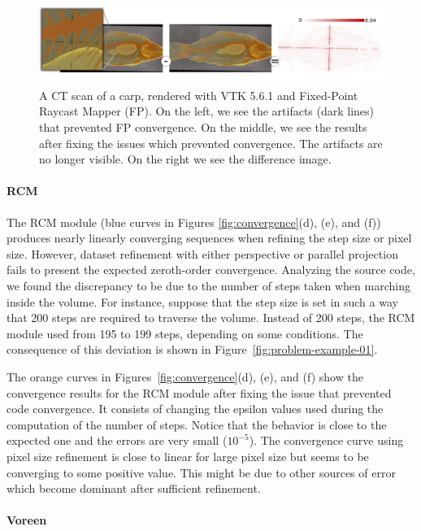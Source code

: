 \begin{figure}[t]
\centering
\includegraphics[width=1\linewidth]{chapter5/figures/carp-difference.png}
\caption{\label{fig:real-dataset-examples}
  A CT scan of a carp,
  rendered with VTK 5.6.1 and Fixed-Point Raycast Mapper (FP). On the
  left, we see the artifacts (dark lines) that prevented FP convergence. On the
  middle, we see the results after fixing the issues which prevented
  convergence. The artifacts are no longer visible. On the right we
  see the difference image.}
\end{figure}

\paragraph*{RCM}
The RCM module (blue curves in Figures \ref{fig:convergence}(d), (e),
and (f)) produces nearly linearly converging sequences when refining
the step size or pixel size.  However, dataset refinement with either
perspective or parallel projection fails to present the expected
zeroth-order convergence. Analyzing the source code, we found the
discrepancy to be due to the number of steps taken when marching
inside the volume. For instance, suppose that the step size is set in
such a way that 200 steps are required to traverse the volume. Instead
of 200 steps, the RCM module used from 195 to 199 steps, depending on
some conditions.  The consequence of this deviation 
is shown in Figure~\ref{fig:problem-example-01}.

The orange curves in Figures~\ref{fig:convergence}(d), (e), and (f)
show the convergence results for the RCM module after fixing the issue
that prevented code convergence. It consists of changing the epsilon
values used during the computation of the number of steps. Notice that
the behavior is close to the expected one and the errors are very
small ($10^{-5}$). The convergence curve using pixel size refinement
is close to linear for large pixel size but seems to be converging to
some positive value. This might be due to other sources of error which
become dominant after sufficient refinement.


\paragraph*{Voreen}

